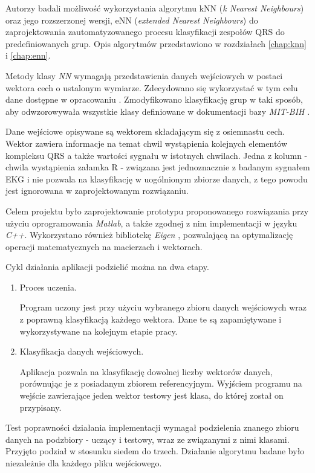 Autorzy badali możliwość wykorzystania algorytmu kNN (\textit{k Nearest Neighbours}) oraz jego rozszerzonej wersji, eNN (\textit{extended Nearest Neighbours}) do zaprojektowania zautomatyzowanego procesu klasyfikacji zespołów QRS do predefiniowanych grup. Opis algorytmów przedstawiono w rozdziałach \ref{chap:knn} i \ref{chap:enn}.

Metody klasy \textit{NN} wymagają przedstawienia danych wejściowych w postaci wektora cech o ustalonym wymiarze. Zdecydowano się wykorzystać w tym celu dane dostępne w opracowaniu \cite{heart-class-module}. Zmodyfikowano klasyfikację grup w taki sposób, aby odwzorowywała wszystkie klasy definiowane w dokumentacji bazy \textit{MIT-BIH} \cite{mitdb}.

Dane wejściowe opisywane są wektorem składającym się z osiemnastu cech. Wektor zawiera informacje na temat chwil wystąpienia kolejnych elementów kompleksu QRS a także wartości sygnału w istotnych chwilach. Jedna z kolumn - chwila wystąpienia załamka R - związana jest jednoznacznie z badanym sygnałem EKG i nie pozwala na klasyfikację w uogólnionym zbiorze danych, z tego powodu jest ignorowana w zaprojektowanym rozwiązaniu.

Celem projektu było zaprojektowanie prototypu proponowanego rozwiązania przy użyciu oprogramowania \textit{Matlab}, a także zgodnej z nim implementacji w języku \textit{C++}. Wykorzystano również bibliotekę \textit{Eigen} \cite{eigen-www}, pozwalającą na optymalizację operacji matematycznych na macierzach i wektorach.

Cykl działania aplikacji podzielić można na dwa etapy.
\begin{enumerate}
	\item Proces uczenia.
	
	Program uczony jest przy użyciu wybranego zbioru danych wejściowych wraz z poprawną klasyfikacją każdego wektora. Dane te są zapamiętywane i wykorzystywane na kolejnym etapie pracy.
	
	\item
	Klasyfikacja danych wejściowych.
	
	Aplikacja pozwala na klasyfikację dowolnej liczby wektorów danych, porównując je z posiadanym zbiorem referencyjnym. Wyjściem programu na wejście zawierające jeden wektor testowy jest klasa, do której został on przypisany.
\end{enumerate}

Test poprawności działania implementacji wymagał podzielenia znanego zbioru danych na podzbiory - uczący i testowy, wraz ze związanymi z nimi klasami. Przyjęto podział w stosunku siedem do trzech. Działanie algorytmu badane było niezależnie dla każdego pliku wejściowego.

